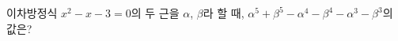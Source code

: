 이차방정식 $x^2-x-3=0$의 두 근을 $\alpha$, $\beta$라 할 때, $\alpha^5+\beta^5-\alpha^4-\beta^4-\alpha^3-\beta^3$의 값은?

